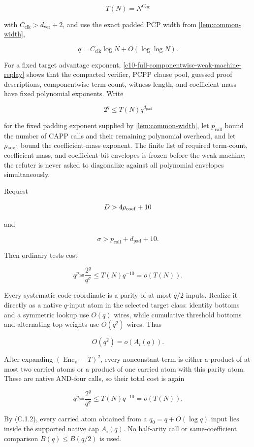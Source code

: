 \documentclass[11pt,letterpaper]{article}
\newcommand{\cref}[1]{\ref{#1}}
\theoremstyle{definition}
\theoremstyle{remark}
\begin{document}
\[
T(N)=N^{C_{\mathrm{clk}}}
\]

with \(C_{\mathrm{clk}}>d_{\mathrm{ver}}+2\), and use the exact padded PCP width from
\cref{lem:common-width},

\[
q=C_{\mathrm{clk}}\log N+O(\log\log N).
\]

For a fixed target advantage exponent, \cref{c10-full-componentwise-weak-machine-replay} shows that the
compacted verifier, PCPP clause pool, guessed proof descriptions,
componentwise term count, witness length, and coefficient mass have
fixed polynomial exponents. Write

\[
2^q\le T(N)q^{d_{\mathrm{pad}}}
\]

for the fixed padding exponent supplied by \cref{lem:common-width}, let
\(p_{\mathrm{call}}\) bound the number of CAPP calls and their remaining
polynomial overhead, and let \(\rho_{\rm coef}\) bound the
coefficient-mass exponent.
The finite list of required term-count, coefficient-mass, and
coefficient-bit envelopes is frozen before the weak machine; the refuter
is never asked to diagonalize against all polynomial envelopes
simultaneously.

Request

\[
D>4\rho_{\rm coef}+10
\]

and

\[
\sigma>p_{\mathrm{call}}+d_{\mathrm{pad}}+10.
\]

Then ordinary tests cost

\[
q^{p_{\mathrm{call}}}\frac{2^q}{q^\sigma}
\le
T(N)q^{-10}
=o(T(N)).
\]

Every systematic code coordinate is a parity of at most \(q/2\) inputs.
Realize it directly as a native \(q\)-input atom in the selected target
class: identity bottoms and a symmetric lookup use \(O(q)\) wires, while
cumulative threshold bottoms and alternating top weights use \(O(q^2)\)
wires. Thus

\[
O(q^2)=o(A_i(q)).
\]

After expanding \((\operatorname{Enc}_s-T)^2\), every nonconstant term
is either a product of at most two carried atoms or a product of one
carried atom with this parity atom. These are native AND-four calls, so
their total cost is again

\[
q^{p_{\mathrm{call}}}\frac{2^q}{q^\sigma}
\le
T(N)q^{-10}
=o(T(N)).
\]

By (C.1.2), every carried atom obtained from a \(q_0=q+O(\log q)\) input
lies inside the supported native cap \(A_i(q)\). No half-arity call or
same-coefficient comparison \(B(q)\le B(q/2)\) is used.
\end{document}

